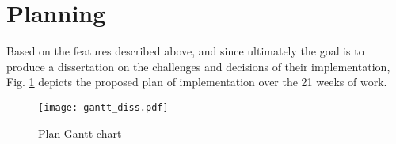 \section{Planning}\label{sec:prob-planning}

Based on the features described above, and since ultimately the goal is to produce a dissertation on the challenges and decisions of their implementation, Fig. \ref{fig:gantt-plan} depicts the proposed plan of implementation over the 21 weeks of work.


\begin{landscape}
\begin{figure}
   \centering
    \texttt{[image: gantt\_diss.pdf]}
    \caption{Plan Gantt chart}
    \label{fig:gantt-plan}
\end{figure}
\end{landscape}




